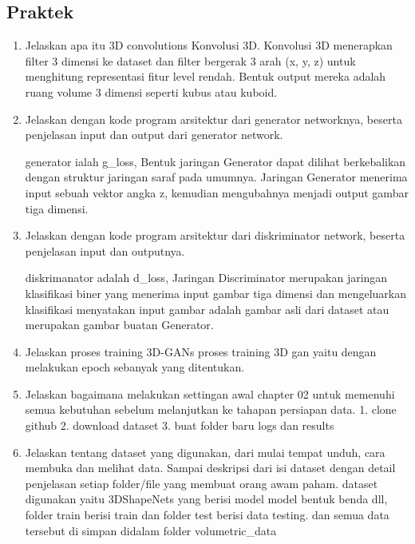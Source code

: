         \subsection{Praktek}
        \begin{enumerate}
        \item Jelaskan apa itu 3D convolutions
        Konvolusi 3D. Konvolusi 3D menerapkan filter 3 dimensi ke dataset dan filter bergerak 3 arah (x, y, z) untuk menghitung representasi fitur level rendah. Bentuk output mereka adalah ruang volume 3 dimensi seperti kubus atau kuboid.
        
        \item Jelaskan dengan kode program arsitektur dari generator networknya, beserta penjelasan input dan output dari generator network.
        
        generator ialah g\_loss, Bentuk jaringan Generator dapat dilihat berkebalikan dengan struktur jaringan saraf pada umumnya. Jaringan Generator menerima input sebuah vektor angka z, kemudian mengubahnya menjadi output gambar tiga dimensi.
        
        \item Jelaskan dengan kode program arsitektur dari diskriminator network, beserta penjelasan input dan outputnya.
        
        diskrimanator adalah d\_loss, Jaringan Discriminator merupakan jaringan klasifikasi biner yang menerima input gambar tiga dimensi dan mengeluarkan klasifikasi menyatakan input gambar adalah gambar asli dari dataset atau merupakan gambar buatan Generator.
        
        \item Jelaskan proses training 3D-GANs
        proses training 3D gan yaitu dengan melakukan epoch sebanyak yang ditentukan.
        
        \item Jelaskan bagaimana melakukan settingan awal chapter 02 untuk memenuhi semua kebutuhan sebelum melanjutkan ke tahapan persiapan data.
        1. clone github										 2. download dataset 									3. buat folder baru logs dan results
        
        \item Jelaskan tentang dataset yang digunakan, dari mulai tempat unduh, cara membuka dan melihat data. Sampai deskripsi dari isi dataset dengan detail penjelasan setiap folder/file yang membuat orang awam paham.
        dataset digunakan yaitu 3DShapeNets yang berisi model model bentuk benda dll, folder train berisi train dan folder test berisi data testing. dan semua data tersebut di simpan didalam folder volumetric\_data 
        

\end{enumerate}
